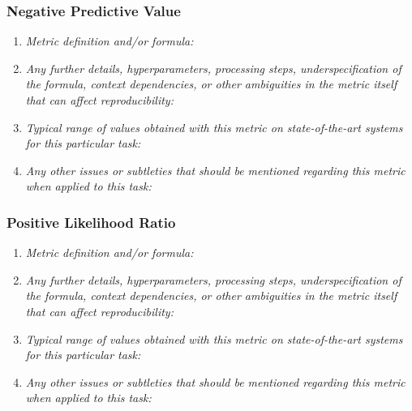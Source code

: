 \documentclass[a4paper,11pt]{article}
\begin{document}
        \subsubsection{Negative Predictive Value}
            \begin{enumerate}[label=\alph*.]
                \item \textit{Metric definition and/or formula:}
                \bigskip
                \item \textit{Any further details, hyperparameters, processing steps, underspecification of the formula, context dependencies, or other ambiguities in the metric itself that can affect reproducibility:}
                \bigskip
                \item \textit{Typical range of values obtained with this metric on state-of-the-art systems for this particular task:}
                \bigskip
                \item \textit{Any other issues or subtleties that should be mentioned regarding this metric when applied to this task:}
                \bigskip
            \end{enumerate}
        \subsubsection{Positive Likelihood Ratio}
            \begin{enumerate}[label=\alph*.]
                \item \textit{Metric definition and/or formula:}
                \bigskip
                \item \textit{Any further details, hyperparameters, processing steps, underspecification of the formula, context dependencies, or other ambiguities in the metric itself that can affect reproducibility:}
                \bigskip
                \item \textit{Typical range of values obtained with this metric on state-of-the-art systems for this particular task:}
                \bigskip
                \item \textit{Any other issues or subtleties that should be mentioned regarding this metric when applied to this task:}
                \bigskip
            \end{enumerate}
\end{document}
